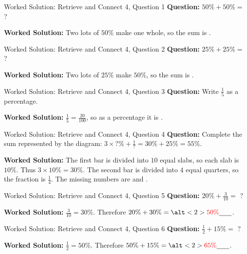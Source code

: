 \documentclass{beamer}
\newcommand{\ablank}[1]{%
  \alt<2>{\textcolor{red}{#1}}{\underline{\phantom{#1}}}%
}
\begin{document}
\begin{frame}[t]{Worked Solution: Retrieve and Connect 4, Question 1}
\hypertarget{work-st4}{}
\textbf{Question:} \(50\% + 50\% =\) ?

\smallskip
\textbf{Worked Solution:} Two lots of \(50\%\) make one whole, so the sum is \ablank{$100\%$}.
\end{frame}

\begin{frame}[t]{Worked Solution: Retrieve and Connect 4, Question 2}
\textbf{Question:} \(25\% + 25\% =\) ?

\smallskip
\textbf{Worked Solution:} Two lots of \(25\%\) make \(50\%\), so the sum is \ablank{$50\%$}.
\end{frame}

\begin{frame}[t]{Worked Solution: Retrieve and Connect 4, Question 3}
\textbf{Question:} Write \(\frac{1}{5}\) as a percentage.

\smallskip
\textbf{Worked Solution:} \(\frac{1}{5} = \frac{20}{100}\), so as a percentage it is \ablank{$20\%$}.
\end{frame}

\begin{frame}[t]{Worked Solution: Retrieve and Connect 4, Question 4}
\textbf{Question:} Complete the sum represented by the diagram: \(3 \times ?\% + \frac{1}{?} = 30\% + 25\% = 55\%\).

\smallskip
\textbf{Worked Solution:} The first bar is divided into \(10\) equal slabs, so each slab is \(10\%\). Thus \(3 \times 10\% = 30\%\). The second bar is divided into \(4\) equal quarters, so the fraction is \(\frac{1}{4}\). The missing numbers are \ablank{$10$} and \ablank{$4$}.
\end{frame}

\begin{frame}[t]{Worked Solution: Retrieve and Connect 4, Question 5}
\textbf{Question:} \(20\% + \frac{3}{10} =\) ?

\smallskip
\textbf{Worked Solution:} \(\frac{3}{10} = 30\%\). Therefore \(20\% + 30\% = \ablank{50\%}\).
\end{frame}

\begin{frame}[t]{Worked Solution: Retrieve and Connect 4, Question 6}
\textbf{Question:} \(\frac{1}{2} + 15\% =\) ?

\smallskip
\textbf{Worked Solution:} \(\frac{1}{2} = 50\%\). Therefore \(50\% + 15\% = \ablank{65\%}\).
\end{frame}
\end{document}
